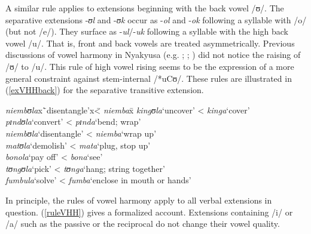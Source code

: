 A similar rule applies to extensions beginning with the back vowel /ʊ/. The separative extensions -\textit{ʊl} and -\textit{ʊk} occur as -\textit{ol} and -\textit{ok} following a syllable with /o/ (but not /e/). They surface as -\textit{ul}/-\textit{uk} following a syllable with the high back vowel /u/. That is, front and back vowels are treated asymmetrically. Previous discussions of vowel harmony in Nyakyusa (e.g. \citealt{MwangokaNVoorhoeveJ1960b}; \citealt{LabroussiC1998}; \citealt{HymanL1999}) did not notice the raising of /ʊ/ to /u/. This rule of high vowel rising seems to be the expression of a more general constraint against stem-internal /*uCʊ/. These rules are illustrated in (\ref{exVHHback}) for the separative transitive extension. 
\begin{exe}
\ex \label{exVHHback}
\begin{tabbing}
\textit{niembʊla}x\=`disentangle'x\= < \textit{niemba}x\=\kill%
\textit{kingʊla}\>`uncover'\> < \textit{kinga}\>`cover' \\
\textit{pɪndʊla}\>`convert'\> < \textit{pɪnda}\>`bend; wrap'\\
\textit{niembʊla}\>`disentangle'\> < \textit{niemba}\>`wrap up'\\
\textit{matʊla}\>`demolish'\> < \textit{mata}\>\lq plug, stop up'\\
\textit{bonola}\>`pay off'\> < \textit{bona}\>`see'\\
\textit{tʊngʊla}\>`pick'\> < \textit{tʊnga}\>`hang; string together'\\
\textit{fumbula}\>`solve'\> < \textit{fumba}\>`enclose in mouth or hands'
\end{tabbing}
\end{exe}

In principle, the rules of vowel harmony apply to all verbal extensions in question. (\ref{ruleVHH}) gives a formalized account. Extensions containing /i/ or /a/ such as the passive or the reciprocal do not change their vowel quality. 

\begin{exe}
\ex \label{ruleVHH}
\\
 \\
\end{exe}

